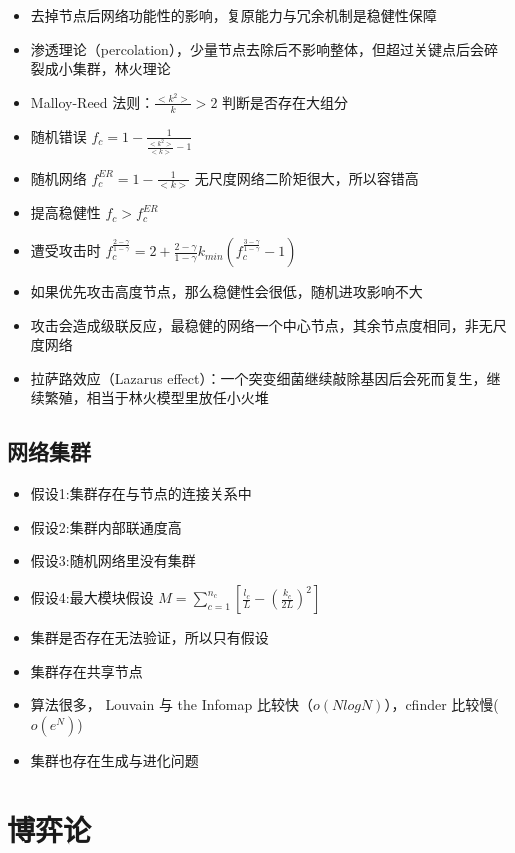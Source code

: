 \documentclass[]{book}
\providecommand{\tightlist}{%
  \setlength{\itemsep}{0pt}\setlength{\parskip}{0pt}}
\begin{document}
\begin{itemize}
\tightlist
\item
  去掉节点后网络功能性的影响，复原能力与冗余机制是稳健性保障
\item
  渗透理论（percolation），少量节点去除后不影响整体，但超过关键点后会碎裂成小集群，林火理论
\item
  Malloy-Reed 法则：\(\frac{<k^2>}{k}>2\) 判断是否存在大组分
\item
  随机错误 \(f_c = 1-\frac{1}{\frac{<k^2>}{<k>}-1}\)
\item
  随机网络 \(f_c^{ER}=1-\frac{1}{<k>}\) 无尺度网络二阶矩很大，所以容错高
\item
  提高稳健性 \(f_c>f_c^{ER}\)
\item
  遭受攻击时 \(f_c^{\frac{2-\gamma}{1-\gamma}}=2+\frac{2-\gamma}{1-\gamma}k_{min}(f_c^{\frac{3-\gamma}{1-\gamma}}-1)\)
\item
  如果优先攻击高度节点，那么稳健性会很低，随机进攻影响不大
\item
  攻击会造成级联反应，最稳健的网络一个中心节点，其余节点度相同，非无尺度网络
\item
  拉萨路效应（Lazarus effect）：一个突变细菌继续敲除基因后会死而复生，继续繁殖，相当于林火模型里放任小火堆
\end{itemize}

\hypertarget{ux7f51ux7edcux96c6ux7fa4}{%
\section{网络集群}\label{ux7f51ux7edcux96c6ux7fa4}}

\begin{itemize}
\tightlist
\item
  假设1:集群存在与节点的连接关系中
\item
  假设2:集群内部联通度高
\item
  假设3:随机网络里没有集群
\item
  假设4:最大模块假设 \(M=\sum_{c=1}^{n_c}[\frac{l_c}{L}-(\frac{k_c}{2L})^2]\)
\item
  集群是否存在无法验证，所以只有假设
\item
  集群存在共享节点
\item
  算法很多， Louvain 与 the Infomap 比较快（\(o(NlogN)\)），cfinder 比较慢(\(o(e^N)\))
\item
  集群也存在生成与进化问题
\end{itemize}

\hypertarget{game}{%
\chapter{博弈论}\label{game}}
\end{document}
